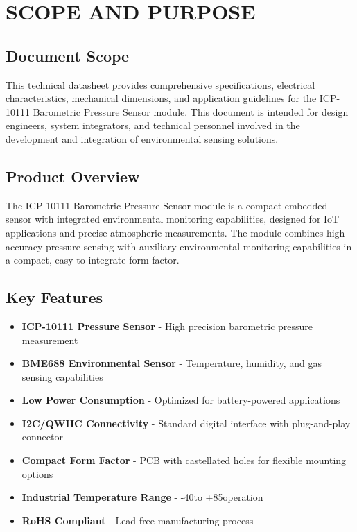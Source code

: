 \documentclass[11pt,a4paper]{article}
\begin{document}
\section{SCOPE AND PURPOSE}

\subsection{Document Scope}

This technical datasheet provides comprehensive specifications, electrical characteristics, mechanical dimensions, and application guidelines for the ICP-10111 Barometric Pressure Sensor module. This document is intended for design engineers, system integrators, and technical personnel involved in the development and integration of environmental sensing solutions.

\subsection{Product Overview}

The ICP-10111 Barometric Pressure Sensor module is a compact embedded sensor with integrated environmental monitoring capabilities, designed for IoT applications and precise atmospheric measurements. The module combines high-accuracy pressure sensing with auxiliary environmental monitoring capabilities in a compact, easy-to-integrate form factor.

\subsection{Key Features}

\begin{itemize}
\item \textbf{ICP-10111 Pressure Sensor} - High precision barometric pressure measurement
\item \textbf{BME688 Environmental Sensor} - Temperature, humidity, and gas sensing capabilities
\item \textbf{Low Power Consumption} - Optimized for battery-powered applications
\item \textbf{I2C/QWIIC Connectivity} - Standard digital interface with plug-and-play connector
\item \textbf{Compact Form Factor} - PCB with castellated holes for flexible mounting options
\item \textbf{Industrial Temperature Range} - -40\degreeC to +85\degreeC operation
\item \textbf{RoHS Compliant} - Lead-free manufacturing process
\end{itemize}
\end{document}
